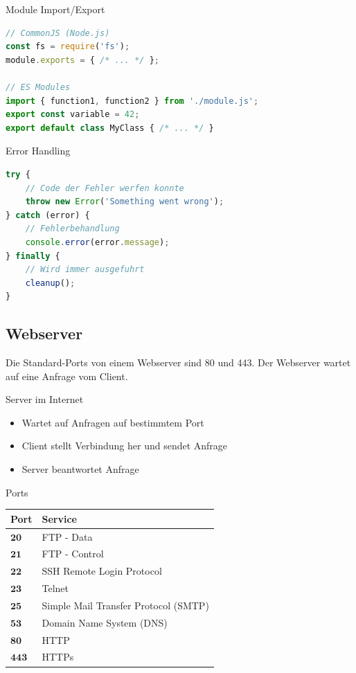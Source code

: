 \begin{KR}{Module Import/Export}
\begin{lstlisting}[language=JavaScript, style=basesmol]
// CommonJS (Node.js)
const fs = require('fs');
module.exports = { /* ... */ };

// ES Modules
import { function1, function2 } from './module.js';
export const variable = 42;
export default class MyClass { /* ... */ }
\end{lstlisting}
\end{KR}

\begin{KR}{Error Handling}
\begin{lstlisting}[language=JavaScript, style=basesmol]
try {
    // Code der Fehler werfen konnte
    throw new Error('Something went wrong');
} catch (error) {
    // Fehlerbehandlung
    console.error(error.message);
} finally {
    // Wird immer ausgefuhrt
    cleanup();
}
\end{lstlisting}
\end{KR}

\subsection{Webserver}
Die Standard-Ports von einem Webserver sind 80 und 443. Der Webserver wartet auf eine Anfrage vom Client.

\begin{definition}{Server im Internet}
\begin{itemize}
  \item Wartet auf Anfragen auf bestimmtem Port
  \item Client stellt Verbindung her und sendet Anfrage
  \item Server beantwortet Anfrage
\end{itemize}
\end{definition}

\begin{corollary}{Ports}
\begin{center}
\begin{tabular}{|l|l|}
\hline
Port & Service \\
\hline
$\mathbf{2 0}$ & FTP - Data \\
\hline
$\mathbf{2 1}$ & FTP - Control \\
\hline
$\mathbf{2 2}$ & SSH Remote Login Protocol \\
\hline
$\mathbf{2 3}$ & Telnet \\
\hline
$\mathbf{2 5}$ & Simple Mail Transfer Protocol (SMTP) \\
\hline
$\mathbf{5 3}$ & Domain Name System (DNS) \\
\hline
$\mathbf{8 0}$ & HTTP \\
\hline
$\mathbf{4 4 3}$ & HTTPs \\
\hline
\end{tabular}
\end{center}
\end{corollary}

